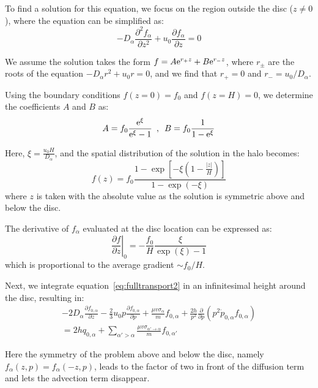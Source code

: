 To find a solution for this equation, we focus on the region outside the disc ($z \ne 0$), where the equation can be simplified as:
%
\begin{equation}
-D_{\alpha} \frac{\partial^2 f_\alpha}{\partial z^2} 
+ u_0 \frac{\partial f_\alpha}{\partial z} = 0
\end{equation}

We assume the solution takes the form $f = A {\rm e}^{r_+ z} + B {\rm e}^{r_- z}$, where $r_\pm$ are the roots of the equation $-D_{\alpha} r^2 + u_0 r = 0$, and we find that $r_+ = 0$ and $r_- = u_0 / D_\alpha$.

Using the boundary conditions $f(z=0) = f_0$ and $f(z=H) = 0$, we determine the coefficients $A$ and $B$ as:
%
\begin{equation}
A = f_0 \frac{{\rm e}^\xi}{{\rm e}^\xi - 1} \,\,\, , \,\,\, B = f_0 \frac{1}{1-{\rm e}^\xi}
\end{equation}

Here, $\xi = \frac{u_0 H}{D_\alpha}$, and the spatial distribution of the solution in the halo becomes:
%
\begin{equation}
f(z) = f_0 \frac{1-{\exp}\left[-\xi(1-\frac{|z|}{H})\right]}{1- \exp(-\xi)}
\end{equation}
%
where $z$ is taken with the absolute value as the solution is symmetric above and below the disc.

The derivative of $f_\alpha$ evaluated at the disc location can be expressed as:
%
\begin{equation}
\left.\frac{\partial f}{\partial z}\right|_0 = -\frac{f_0}{H} \frac{\xi}{\exp (\xi) - 1}
\label{eq:fgradient}
\end{equation}
%
which is proportional to the average gradient $\sim f_0/H$.

Next, we integrate equation~\ref{eq:fulltransport2} in an infinitesimal height around the disc, resulting in:
%
\begin{multline}
-2 D_{\alpha} \frac{\partial f_{0,\alpha}}{\partial z} 
- \frac{2}{3} u_0 p \frac{\partial f_{0,\alpha}}{\partial p}
+ \frac{\mu v \sigma_\alpha}{m} f_{0,\alpha}
+ \frac{2 h}{p^2} \frac{\partial}{\partial p}(p^2 \dot{p}_{0,\alpha} f_{0,\alpha} ) \\
= 2h q_{0,\alpha} 
+ \sum_{\alpha'>\alpha} \frac{\mu v \sigma_{\alpha'\rightarrow\alpha}}{m}  f_{0,\alpha'}
\label{eq:fulltransportabovebelow}
\end{multline}

Here the symmetry of the problem above and below the disc, namely $f_\alpha(z, p) = f_\alpha(-z, p)$, leads to the factor of two in front of the diffusion term and lets the advection term disappear.

